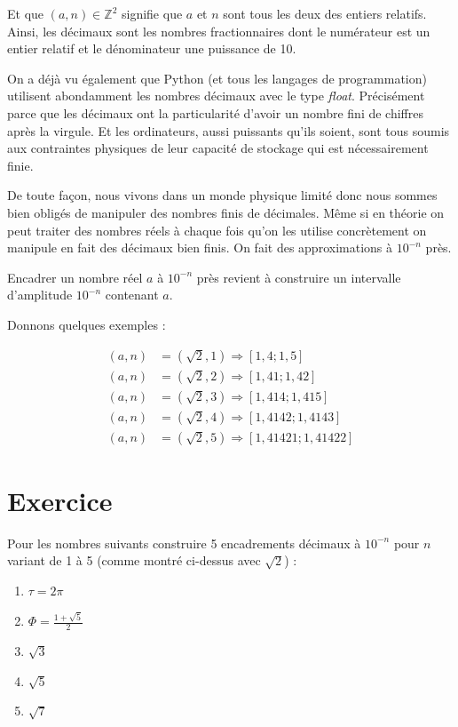 \documentclass[a4paper, 11pt, twoside]{book}
\newcommand{\Z}{\mathbb{Z}}
\begin{document}
Et que \((a, n)\in\Z^2\) signifie que \(a\) et \(n\) sont tous
les deux des entiers relatifs. Ainsi, les décimaux sont les nombres
fractionnaires dont le numérateur est un entier relatif et le
dénominateur une puissance de 10.

On a déjà vu également que Python (et tous les langages de
programmation) utilisent abondamment les nombres décimaux avec le
type \emph{float}. Précisément parce que les décimaux ont la
particularité d'avoir un nombre fini de chiffres après la
virgule. Et les ordinateurs, aussi puissants qu'ils soient, sont
tous soumis aux contraintes physiques de leur capacité de
stockage qui est nécessairement finie.

De toute façon, nous vivons dans un monde physique limité donc nous
sommes bien obligés de manipuler des nombres finis de
décimales. Même si en théorie on peut traiter des nombres réels à
chaque fois qu'on les utilise concrètement on manipule en fait des
décimaux bien finis. On fait des approximations à \(10^{-n}\) près.

Encadrer un nombre réel \(a\) à \(10^{-n}\) près revient à construire
un intervalle d'amplitude \(10^{-n}\) contenant \(a\).

Donnons quelques exemples :

\begin{align*}
(a, n) &= (\sqrt{2}, 1)\Rightarrow [1,4 ; 1,5]\\
(a, n) &= (\sqrt{2}, 2)\Rightarrow [1,41 ; 1,42]\\
(a, n) &= (\sqrt{2}, 3)\Rightarrow [1,414 ; 1,415]\\
(a, n) &= (\sqrt{2}, 4)\Rightarrow [1,4142 ; 1,4143]\\
(a, n) &= (\sqrt{2}, 5)\Rightarrow [1,41421 ; 1,41422]
\end{align*}

\section{Exercice}
\label{sec:org1982ef0}
Pour les nombres suivants construire 5 encadrements décimaux à
\(10^{-n}\) pour \(n\) variant de 1 à 5 (comme montré ci-dessus avec
\(\sqrt{2}\)) :
\begin{enumerate}
\item \(\tau = 2\pi\)
\item \(\Phi = \frac{1 + \sqrt{5}}{2}\)
\item \(\sqrt{3}\)
\item \(\sqrt{5}\)
\item \(\sqrt{7}\)
\end{enumerate}
\end{document}
